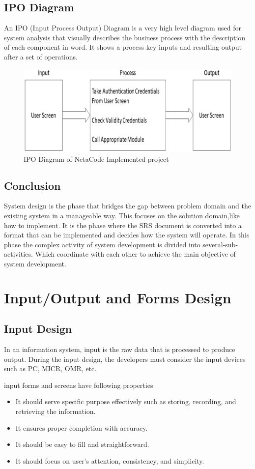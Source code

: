 \documentclass[a4paper,12pt]{report}
\begin{document}
\section{IPO Diagram}
An IPO (Input Process Output) Diagram is a very high level diagram used for system analysis that visually describes the business process with the description of each component in word. It shows a process key inputs and resulting output after a set of operations.
\begin{figure}
	\centering
	\includegraphics[width=0.7\linewidth]{9_4}
	\caption{IPO Diagram of NetaCode Implemented project}
	\label{fig:94}
\end{figure}
\section{Conclusion}
System design is the phase that bridges the gap between problem domain and the existing system in a manageable way. This focuses on the solution domain,like how to implement. It is the phase where the SRS document is converted into a format that can be implemented and decides how the system will operate. In this phase the complex activity of system development is divided into several-sub-activities. Which coordinate with each other to achieve the main objective of system development.









\chapter{Input/Output and Forms Design}
\section{Input Design}
In an information system, input is the raw data that is processed to produce output. During the input design, the developers must consider the input devices such as PC, MICR, OMR, etc.

input forms and screens have following properties 
\begin{itemize}
	\item	It should serve specific purpose effectively such as storing, recording, and retrieving the information.
	\item	It ensures proper completion with accuracy.
	\item It should be easy to fill and straightforward.
	\item	It should focus on user’s attention, consistency, and simplicity.
\end{itemize}
\end{document}
